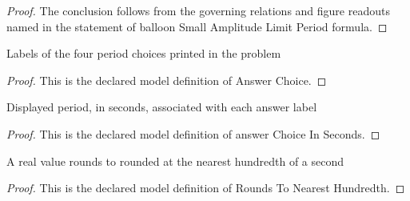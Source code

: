\begin{proof}
  The conclusion follows from the governing relations and figure readouts named in the statement of balloon Small Amplitude Limit Period formula.
\end{proof}
\begin{definition}
  \label{def:physics:phyx-mini-0234:phyxminiproblems-problemphyxmini0234-answerchoice}
  Labels of the four period choices printed in the problem
\end{definition}
\begin{proof}
  This is the declared model definition of Answer Choice.
\end{proof}
\begin{definition}
  \label{def:physics:phyx-mini-0234:phyxminiproblems-problemphyxmini0234-answerchoiceinseconds}
  Displayed period, in seconds, associated with each answer label
\end{definition}
\begin{proof}
  This is the declared model definition of answer Choice In Seconds.
\end{proof}
\begin{definition}
  \label{def:physics:phyx-mini-0234:phyxminiproblems-problemphyxmini0234-roundstonearesthundredth}
  A real value rounds to rounded at the nearest hundredth of a second
\end{definition}
\begin{proof}
  This is the declared model definition of Rounds To Nearest Hundredth.
\end{proof}
